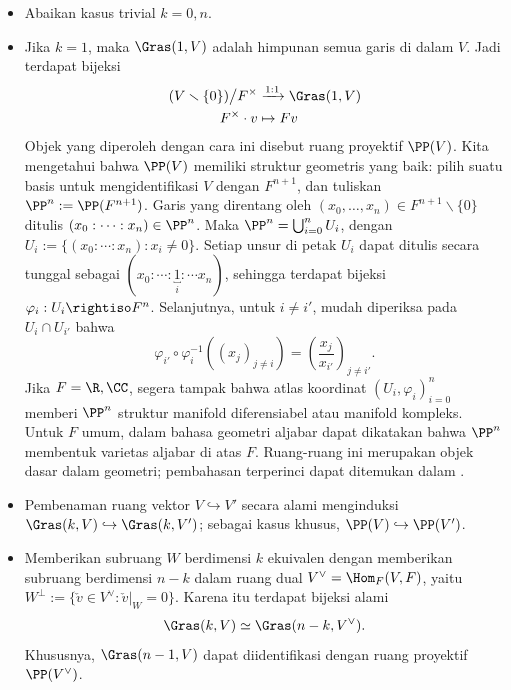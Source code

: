 \begin{itemize}
	\item Abaikan kasus trivial $k=0,n$.
	\item Jika $k=1$, maka $\Gras(1, V)$ adalah himpunan semua garis di dalam $V$. Jadi terdapat bijeksi
		\begin{align*}
			(V \smallsetminus \{0\}) \big/ F^\times & \xrightarrow{1:1} \Gras(1, V) \\
			F^\times \cdot v & \mapsto Fv
		\end{align*}
		Objek yang diperoleh dengan cara ini disebut ruang proyektif $\PP(V)$. Kita mengetahui bahwa $\PP(V)$ memiliki struktur geometris yang baik: pilih suatu basis untuk mengidentifikasi $V$ dengan $F^{n+1}$, dan tuliskan $\PP^n := \PP(F^{n+1})$. Garis yang direntang oleh $(x_0, \ldots, x_n) \in F^{n+1} \smallsetminus \{0\}$ ditulis $(x_0: \cdots :x_n) \in \PP^n$. Maka $\PP^n = \bigcup_{i=0}^n U_i$, dengan $U_i := \{(x_0: \cdots :x_n) : x_i \neq 0 \}$. Setiap unsur di petak $U_i$ dapat ditulis secara tunggal sebagai $(x_0: \cdots: \underbracket{1}_{i}: \cdots x_n)$, sehingga terdapat bijeksi $\varphi_i: U_i \rightiso F^n$. Selanjutnya, untuk $i \neq i'$, mudah diperiksa pada $U_i \cap U_{i'}$ bahwa
		\[ \varphi_{i'} \circ \varphi_i^{-1}\left( (x_j)_{j \neq i} \right) = \left( \frac{x_j}{x_{i'}} \right)_{j \neq i'}. \]
		Jika $F=\R, \CC$, segera tampak bahwa atlas koordinat $(U_i, \varphi_i)_{i=0}^n$ memberi $\PP^n$ struktur manifold diferensiabel atau manifold kompleks. Untuk $F$ umum, dalam bahasa geometri aljabar dapat dikatakan bahwa $\PP^n$ membentuk varietas aljabar di atas $F$. Ruang-ruang ini merupakan objek dasar dalam geometri; pembahasan terperinci dapat ditemukan dalam \cite[\S 5.3]{Xi18}.
	\item Pembenaman ruang vektor $V \hookrightarrow V'$ secara alami menginduksi $\Gras(k, V) \hookrightarrow \Gras(k, V')$; sebagai kasus khusus, $\PP(V) \hookrightarrow \PP(V')$.
	\item Memberikan subruang $W$ berdimensi $k$ ekuivalen dengan memberikan subruang berdimensi $n-k$ dalam ruang dual $V^\vee = \Hom_F(V,F)$, yaitu $W^\perp := \{ \check{v} \in V^\vee : \check{v}|_W = 0 \}$. Karena itu terdapat bijeksi alami
		\[ \Gras(k, V) \simeq \Gras(n-k, V^\vee). \]
		Khususnya, $\Gras(n-1, V)$ dapat diidentifikasi dengan ruang proyektif $\PP(V^\vee)$.
\end{itemize}

